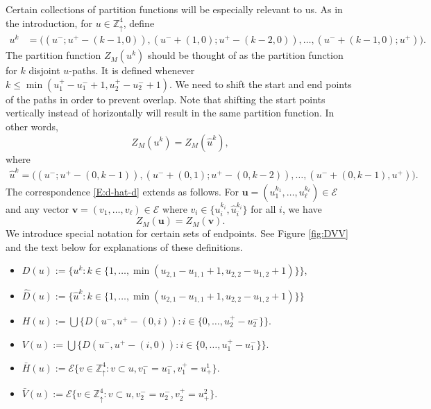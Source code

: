\documentclass[aop, preprint]{imsart}
\theoremstyle{plain}
\theoremstyle{definition}
\theoremstyle{plain}
\newcommand{\sset}{\subset}
\newcommand{\scrE}{\mathcal{E}}
\newcommand{\Zd}{\mathds{Z}^4_\uparrow}
\newcommand{\bu}{\mathbf{u}}
\newcommand{\bv}{\mathbf{v}}
\begin{document}
Certain collections of partition functions will be especially relevant to us. As in the introduction, for $u \in \Zd$, define
\begin{align}
\label{E:uk}
u^k &= \big((u^-; u^+ - (k - 1, 0)), (u^- + (1, 0); u^+ - (k - 2, 0)), \dots, (u^- + (k-1, 0); u^+) \big).
\end{align}
The partition function $Z_M(u^k)$ should be thought of as the partition function for $k$ disjoint $u$-paths. It is defined whenever $k \le \min(u^+_1 - u^-_1 + 1, u^+_2 - u^-_2 + 1)$. 
We need to shift the start and end points of the paths in order to prevent overlap. Note that shifting the start points vertically instead of horizontally will result in the same partition function. In other words, 
\begin{equation}
\label{E:d-hat-d}
Z_M(u^k) = Z_M(\hat u^k),
\end{equation}
where
\begin{align*}
\hat u ^k = \big((u^-; u^+ - (0, k - 1)), (u^- + (0, 1);  u^+ - (0, k - 2)), \dots, (u^- + (0, k - 1), u^+) \big).
\end{align*} 
The correspondence \eqref{E:d-hat-d} extends as follows. For $\bu = (u_1^{k_1}, \dots, u_\ell^{k_\ell}) \in \scrE$ and any vector $\bv = (v_1, \dots, v_\ell) \in \scrE$ where $v_i \in \{u_i^{k_i}, \hat u_i^{k_i}\}$ for all $i$, we have
\begin{equation}
\label{E:d-hat-d'}
Z_M(\bu) = Z_M(\bv).
\end{equation}
We introduce special notation for certain sets of endpoints. See Figure \ref{fig:DVV} and the text below for explanations of these definitions.
\begin{itemize}[nosep]
	\item $D(u) := \{u^k : k \in \{1, \dots, \min(u_{2, 1} - u_{1, 1} + 1, u_{2, 2} - u_{1, 2} + 1)\}\}$,
	\item $\hat D(u) := \{\hat u^k : k \in \{1, \dots, \min(u_{2, 1} - u_{1, 1} + 1, u_{2, 2} - u_{1, 2} + 1)\}\}$
	\item $H(u) := \bigcup \{ D(u^-, u^+ - (0, i)) : i \in \{0, \dots, u^+_2 - u^-_2\}\}$.
	\item $V(u) := \bigcup \{ D(u^-, u^+ - (i, 0)) : i \in \{0, \dots, u^+_1 - u^-_1\}\}.$
	\item $\bar H(u) := \scrE \{v \in \Zd : v \sset u, v_1^- = u^-_1, v_1^+ = u^1_+\}.$
	\item $\bar V(u) := \scrE \{v \in \Zd : v \sset u,  v_2^- = u^-_2, v_2^+ = u^2_+\}.$
\end{itemize}
\end{document}
